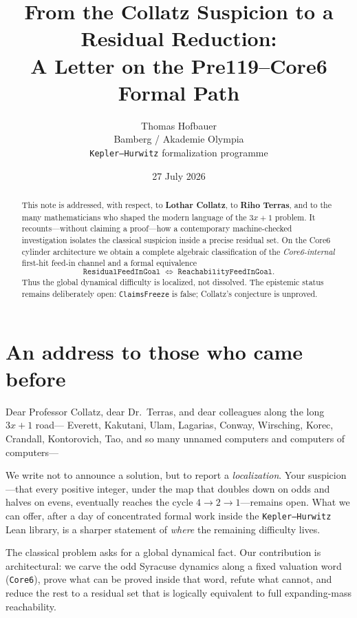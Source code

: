 \documentclass[11pt,a4paper]{article}
\title{%
  From the Collatz Suspicion to a Residual Reduction:\\
  A Letter on the Pre119--Core6 Formal Path
}
\author{%
  Thomas Hofbauer\\
  \small Bamberg / Akademie Olympia\\
  \small\texttt{Kepler--Hurwitz} formalization programme
}
\date{27 July 2026}
\theoremstyle{definition}
\theoremstyle{remark}
\begin{document}
\maketitle

\begin{abstract}
This note is addressed, with respect, to \textbf{Lothar Collatz},
to \textbf{Riho Terras}, and to the many mathematicians who shaped the
modern language of the $3x+1$ problem.
It recounts---without claiming a proof---how a contemporary
machine-checked investigation isolates the classical suspicion inside a
precise residual set.
On the Core6 cylinder architecture we obtain a complete algebraic
classification of the \emph{Core6-internal} first-hit feed-in channel and a
formal equivalence
\[
  \mathtt{ResidualFeedInGoal}
  \;\Longleftrightarrow\;
  \mathtt{ReachabilityFeedInGoal}.
\]
Thus the global dynamical difficulty is localized, not dissolved.
The epistemic status remains deliberately open: \texttt{ClaimsFreeze}
is false; Collatz's conjecture is unproved.
\end{abstract}

\tableofcontents
\vspace{1em}

\section{An address to those who came before}

Dear Professor Collatz,
dear Dr.~Terras,
and dear colleagues along the long $3x+1$ road---
Everett, Kakutani, Ulam, Lagarias, Conway, Wirsching, Korec, Crandall,
Kontorovich, Tao, and so many unnamed computers and computers of computers---

We write not to announce a solution, but to report a \emph{localization}.
Your suspicion---that every positive integer, under the map that doubles down
on odds and halves on evens, eventually reaches the cycle
$4\to 2\to 1$---remains open.
What we can offer, after a day of concentrated formal work inside the
\texttt{Kepler--Hurwitz} Lean library, is a sharper statement of
\emph{where} the remaining difficulty lives.

The classical problem asks for a global dynamical fact.
Our contribution is architectural:
we carve the odd Syracuse dynamics along a fixed valuation word
(\texttt{Core6}), prove what can be proved inside that word, refute what
cannot, and reduce the rest to a residual set that is logically equivalent
to full expanding-mass reachability.
\end{document}
